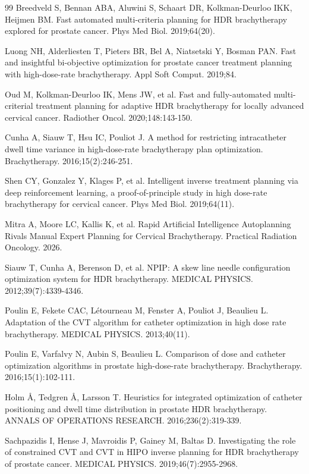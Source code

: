 \documentclass[12pt,twoside,letterpaper]{article}
\newcounter{algorithm}
\begin{document}
\begin{thebibliography}{99}
 Breedveld S, Bennan ABA, Aluwini S, Schaart DR, Kolkman-Deurloo IKK, Heijmen BM. Fast automated multi-criteria planning for HDR brachytherapy explored for prostate cancer. Phys Med Biol. 2019;64(20).

 Luong NH, Alderliesten T, Pieters BR, Bel A, Niatsetski Y, Bosman PAN. Fast and insightful bi-objective optimization for prostate cancer treatment planning with high-dose-rate brachytherapy. Appl Soft Comput. 2019;84.

 Oud M, Kolkman-Deurloo IK, Mens JW, et al. Fast and fully-automated multi-criterial treatment planning for adaptive HDR brachytherapy for locally advanced cervical cancer. Radiother Oncol. 2020;148:143-150.

 Cunha A, Siauw T, Hsu IC, Pouliot J. A method for restricting intracatheter dwell time variance in high-dose-rate brachytherapy plan optimization. Brachytherapy. 2016;15(2):246-251.

 Shen CY, Gonzalez Y, Klages P, et al. Intelligent inverse treatment planning via deep reinforcement learning, a proof-of-principle study in high dose-rate brachytherapy for cervical cancer. Phys Med Biol. 2019;64(11).

 Mitra A, Moore LC, Kallis K, et al. Rapid Artificial Intelligence Autoplanning Rivals Manual Expert Planning for Cervical Brachytherapy. Practical Radiation Oncology. 2026.

 Siauw T, Cunha A, Berenson D, et al. NPIP: A skew line needle configuration optimization system for HDR brachytherapy. MEDICAL PHYSICS. 2012;39(7):4339-4346.

 Poulin E, Fekete CAC, Létourneau M, Fenster A, Pouliot J, Beaulieu L. Adaptation of the CVT algorithm for catheter optimization in high dose rate brachytherapy. MEDICAL PHYSICS. 2013;40(11).

 Poulin E, Varfalvy N, Aubin S, Beaulieu L. Comparison of dose and catheter optimization algorithms in prostate high-dose-rate brachytherapy. Brachytherapy. 2016;15(1):102-111.

 Holm Å, Tedgren Å, Larsson T. Heuristics for integrated optimization of catheter positioning and dwell time distribution in prostate HDR brachytherapy. ANNALS OF OPERATIONS RESEARCH. 2016;236(2):319-339.

 Sachpazidis I, Hense J, Mavroidis P, Gainey M, Baltas D. Investigating the role of constrained CVT and CVT in HIPO inverse planning for HDR brachytherapy of prostate cancer. MEDICAL PHYSICS. 2019;46(7):2955-2968.


\end{thebibliography}
\end{document}

